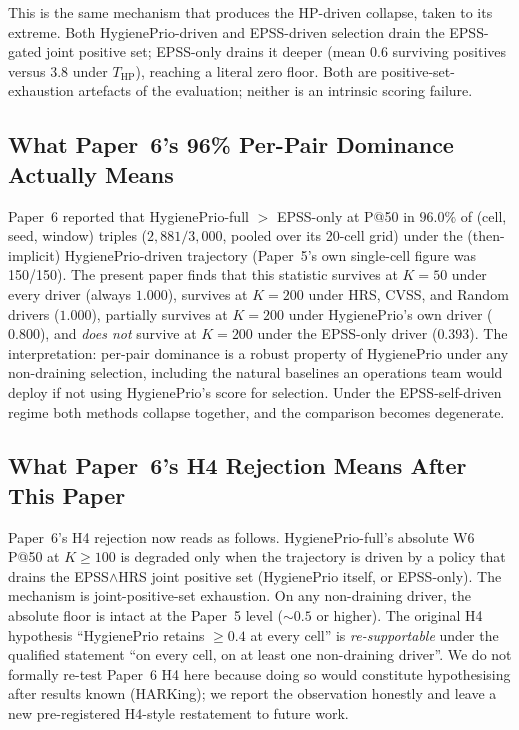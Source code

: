 This is the same mechanism that produces the HP-driven collapse, taken
to its extreme. Both HygienePrio-driven and EPSS-driven selection
drain the EPSS-gated joint positive set; EPSS-only drains it deeper
(mean $0.6$ surviving positives versus $3.8$ under
$T_{\mathrm{HP}}$), reaching a literal zero floor. Both are
positive-set-exhaustion artefacts of the evaluation; neither is an
intrinsic scoring failure.

\subsection{What Paper~6's 96\% Per-Pair Dominance Actually Means}

Paper~6 reported that HygienePrio-full $>$ EPSS-only at P@50 in
$96.0\%$ of (cell, seed, window) triples ($2{,}881/3{,}000$, pooled
over its 20-cell grid) under the (then-implicit) HygienePrio-driven
trajectory (Paper~5's own single-cell figure was 150/150). The
present paper finds that this
statistic survives at $K = 50$ under every driver (always $1.000$),
survives at $K = 200$ under HRS, CVSS, and Random drivers
($1.000$), partially survives at $K = 200$ under HygienePrio's own
driver ($0.800$), and \textit{does not} survive at $K = 200$ under
the EPSS-only driver ($0.393$). The interpretation: per-pair
dominance is a robust property of HygienePrio under any
non-draining selection, including the natural baselines an operations
team would deploy if not using HygienePrio's score for selection.
Under the EPSS-self-driven regime both methods collapse together,
and the comparison becomes degenerate.

\subsection{What Paper~6's H4 Rejection Means After This Paper}

Paper~6's H4 rejection now reads as follows. HygienePrio-full's
absolute W6 P@50 at $K \geq 100$ is degraded only when the
trajectory is driven by a policy that drains the EPSS$\wedge$HRS
joint positive set (HygienePrio itself, or EPSS-only). The mechanism
is joint-positive-set exhaustion. On any non-draining driver, the
absolute floor is
intact at the Paper~5 level ($\sim 0.5$ or higher). The original
H4 hypothesis ``HygienePrio retains $\geq 0.4$ at every cell'' is
\textit{re-supportable} under the qualified statement ``on every cell,
on at least one non-draining driver''. We do not formally re-test Paper~6
H4 here because doing so would constitute hypothesising after results
known (HARKing); we report the observation honestly and leave a
new pre-registered H4-style restatement to future work.

